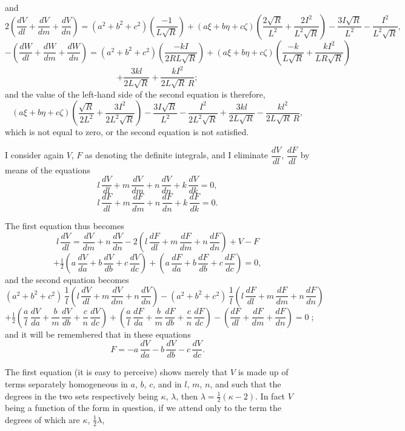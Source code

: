\documentclass[11pt]{article}
\begin{document}
\medskip

\noindent and
\[
2\left(\frac{dV}{dl} + \frac{dV}{dm} + \frac{dV}{dn}\right) = (a^{2} + b^{2} + c^{2})\left(\frac{-1}{L\sqrt{R}}\right) + (a\xi + b\eta + c\zeta)\left(\frac{2\sqrt{R}}{L^{2}} + \frac{2I^{2}}{L^{2}\sqrt{R}}\right) - \frac{3I\sqrt{R}}{L^{2}} - \frac{I^{2}}{L^{2}\sqrt{R}},
\]
\[
- \left(\frac{dW}{dl} + \frac{dW}{dm} + \frac{dW}{dn}\right) = (a^{2} + b^{2} + c^{2})\left(\frac{-kI}{2RL\sqrt{R}}\right) + (a\xi + b\eta + c\zeta)\left(\frac{-k}{L\sqrt{R}} + \frac{kI^{2}}{LR\sqrt{R}}\right)
\]
\[
+ \frac{3kl}{2L\sqrt{R}} + \frac{kI^{2}}{2L\sqrt{R}\,R};
\]
and the value of the left-hand side of the second equation is therefore,
\[
(a\xi + b\eta + c\zeta)\left(\frac{\sqrt{R}}{2L^{2}} + \frac{3I^{2}}{2L^{2}\sqrt{R}}\right) - \frac{3I\sqrt{R}}{L^{2}} - \frac{I^{2}}{2L^{2}\sqrt{R}} + \frac{3kl}{2L\sqrt{R}} - \frac{kl^{2}}{2L\sqrt{R}\,R},
\]
which is not equal to zero, or the second equation is not satisfied.

I consider again $V$, $F$ as denoting the definite integrals, and I eliminate $\dfrac{dV}{dl}$, $\dfrac{dF}{dl}$
by means of the equations
\[
l\,\frac{dV}{dl} + m\,\frac{dV}{dm} + n\,\frac{dV}{dn} + k\,\frac{dV}{dk} = 0,
\]
\[
l\,\frac{dF}{dl} + m\,\frac{dF}{dm} + n\,\frac{dF}{dn} + k\,\frac{dF}{dk} = 0.
\]

The first equation thus becomes
\[
l\,\frac{dV}{dl} = \frac{dV}{dm} + n\,\frac{dV}{dn} - 2\left(l\,\frac{dF}{dl} + m\,\frac{dF}{dm} + n\,\frac{dF}{dn}\right) + V - F
\]
\[
+ \tfrac{1}{2}\left(a\,\frac{dV}{da} + b\,\frac{dV}{db} + c\,\frac{dV}{dc}\right) + \left(a\,\frac{dF}{da} + b\,\frac{dF}{db} + c\,\frac{dF}{dc}\right) = 0,
\]
and the second equation becomes
\[
(a^{2} + b^{2} + c^{2})\,\frac{1}{l}\left(l\,\frac{dV}{dl} + m\,\frac{dV}{dm} + n\,\frac{dV}{dn}\right) - (a^{2} + b^{2} + c^{2})\,\frac{1}{l}\left(l\,\frac{dF}{dl} + m\,\frac{dF}{dm} + n\,\frac{dF}{dn}\right)
\]
\[
+ \tfrac{1}{2}\left(\frac{a}{l}\,\frac{dV}{da} + \frac{b}{m}\,\frac{dV}{db} + \frac{c}{n}\,\frac{dV}{dc}\right) + \left(\frac{a}{l}\,\frac{dF}{da} + \frac{b}{m}\,\frac{dF}{db} + \frac{c}{n}\,\frac{dF}{dc}\right) - \left(\frac{dF}{dl} + \frac{dF}{dm} + \frac{dF}{dn}\right) = 0\;;
\]
and it will be remembered that in these equations
\[
F = - a\,\frac{dV}{da} - b\,\frac{dV}{db} - c\,\frac{dV}{dc}.
\]

The first equation (it is easy to perceive) shows merely that $V$ is made up of terms
separately homogeneous in $a$, $b$, $c$, and in $l$, $m$, $n$, and such that the degrees in the
two sets respectively being $\kappa$, $\lambda$, then $\lambda = \tfrac{1}{2}(\kappa - 2)$. In fact $V$ being a function of
the form in question, if we attend only to the term the degrees of which are $\kappa$, $\tfrac{1}{2}\lambda$,
\end{document}
